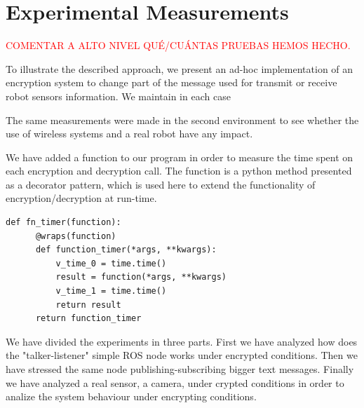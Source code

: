 \documentclass[journal,twoside]{JoPhA}
\begin{document}
\section{Experimental Measurements}

\textcolor{red}{COMENTAR A ALTO NIVEL QU\'E/CU\'ANTAS PRUEBAS HEMOS HECHO.}

To illustrate the described approach, we present an ad-hoc implementation of an encryption system to change part of the message used for transmit or receive robot sensors information. 
We maintain in each case 


The same measurements were made in the second environment to see whether the use of wireless systems and a real robot have any impact.



We have added a function to our program in order to measure the time spent on each encryption and decryption call. The function is a python method presented as a decorator pattern, which is used here to extend the functionality of encryption/decryption at run-time. 


{
  \footnotesize{
    \begin{Verbatim}[frame=single]
def fn_timer(function):
	  @wraps(function)
	  def function_timer(*args, **kwargs):
	      v_time_0 = time.time()
	      result = function(*args, **kwargs)
	      v_time_1 = time.time()
	      return result
	  return function_timer
    \end{Verbatim}
  }
}

We have divided the experiments in three parts. First we have analyzed how does the "talker-listener" simple ROS node works under encrypted conditions. Then we have stressed the same node publishing-subscribing bigger text messages. Finally we have analyzed a real sensor, a camera, under crypted conditions in order to analize the system behaviour under encrypting conditions.  
\end{document}
